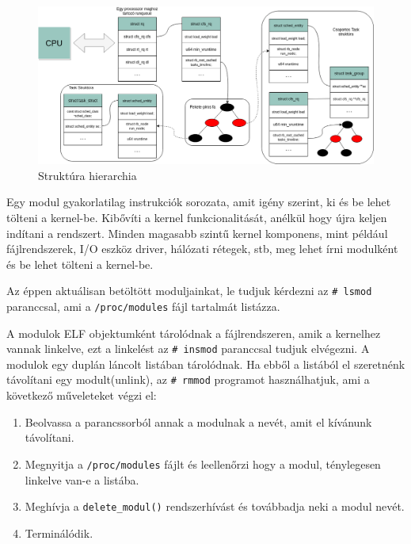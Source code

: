 \begin{figure}[h!]
\centering
\includegraphics[width=\textwidth]{images/structureHierarchy.png}
\caption{Struktúra hierarchia}
\label{fig:structurehierarchi}
\end{figure}

Egy modul gyakorlatilag instrukciók sorozata, amit igény szerint, ki és be lehet tölteni a kernel-be. Kibővíti a kernel funkcionalitását, anélkül hogy újra keljen indítani a rendszert. Minden magasabb szintű kernel komponens, mint például fájlrendszerek, I/O eszköz driver, hálózati rétegek, stb, meg lehet írni modulként és be lehet tölteni a kernel-be.

\noindent Az éppen aktuálisan betöltött moduljainkat, le tudjuk kérdezni az \texttt{\# lsmod} paranccsal, ami a \texttt{/proc/modules} fájl tartalmát listázza.

A modulok ELF objektumként tárolódnak a fájlrendszeren, amik a kernelhez vannak linkelve, ezt a linkelést az \texttt{\# insmod} paranccsal tudjuk elvégezni.
A modulok egy duplán láncolt listában tárolódnak.
Ha ebből a listából el szeretnénk távolítani egy modult(unlink), az \texttt{\# rmmod} programot használhatjuk, ami a következő műveleteket végzi el:
\begin{enumerate}
	\item Beolvassa a parancssorból annak a modulnak a nevét, amit el kívánunk távolítani.
	\item Megnyitja a \texttt{/proc/modules} fájlt és leellenőrzi hogy a modul, ténylegesen linkelve van-e a listába.
	\item Meghívja a \texttt{delete\_modul()} rendszerhívást és továbbadja neki a modul nevét.
	\item Terminálódik.
\end{enumerate} 

